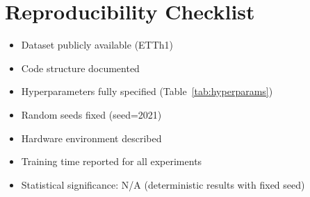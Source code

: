 \documentclass[10pt,twocolumn,letterpaper]{article}
\begin{document}
\section{Reproducibility Checklist}

\begin{itemize}
    \item[$\checkmark$] Dataset publicly available (ETTh1)
    \item[$\checkmark$] Code structure documented
    \item[$\checkmark$] Hyperparameters fully specified (Table~\ref{tab:hyperparams})
    \item[$\checkmark$] Random seeds fixed (seed=2021)
    \item[$\checkmark$] Hardware environment described
    \item[$\checkmark$] Training time reported for all experiments
    \item[$\checkmark$] Statistical significance: N/A (deterministic results with fixed seed)
\end{itemize}
\end{document}
